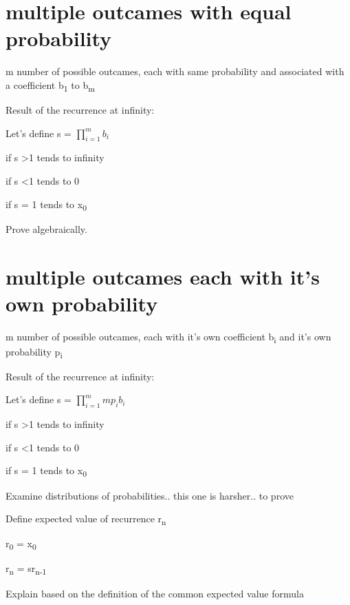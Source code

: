 \documentclass[12pt,reqno]{amsart}
\begin{document}
\section{multiple outcames with equal probability}

m number of possible outcames, each with same probability and associated with a coefficient b\textsubscript{1} to b\textsubscript{m}



Result of the recurrence at infinity:



Let's define s = $\prod_{i=1}^{m} b_{i}$

if s \textgreater 1 tends to infinity

if s \textless 1 tends to 0

if s = 1 tends to x\textsubscript{0}


Prove algebraically.

\section{multiple outcames each with it's own probability}

m number of possible outcames, each with it's own coefficient b\textsubscript{i} and it's own probability p\textsubscript{i}

Result of the recurrence at infinity:

Let's define s = $\prod_{i=1}^{m} mp_{i}b_{i}$



if s \textgreater 1 tends to infinity

if s \textless 1 tends to 0

if s = 1 tends to x\textsubscript{0}



Examine distributions of probabilities.. this one is harsher.. to prove



Define expected value of recurrence r\textsubscript{n}

r\textsubscript{0} = x\textsubscript{0}

r\textsubscript{n} = sr\textsubscript{n-1}

Explain based on the definition of the common expected value formula
\end{document}
